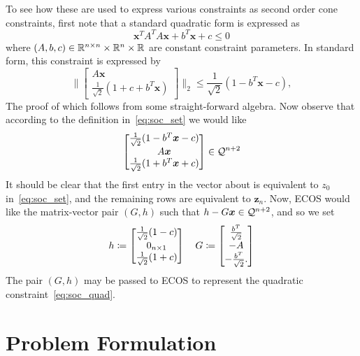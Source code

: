 \documentclass[12pt]{article}
\begin{document}
To see how these are used to express various constraints as second order cone constraints, first note that a standard quadratic form is expressed as
\begin{equation}
\bm{x}^T A ^T A \bm{x} + b^T \bm{x} + c \leq 0
\label{eq:soc_quad}
\end{equation}
where $(A,b,c) \in {\mathbb{R}}^{n\times n} \times {\mathbb{R}}^n \times {\mathbb{R}}$ are constant constraint parameters. In standard form, this constraint is expressed by
\begin{equation}
\biggr\| \begin{bmatrix}
A \bm{x} \\ \frac{1}{\sqrt{2}}( 1 + c + b^T \bm{x} )
\end{bmatrix} \biggr\|_2 \leq \frac{1}{\sqrt{2}} ( 1 - b^T \bm{x} - c),
\label{eq:soc_std}
\end{equation} 
The proof of which follows from some straight-forward algebra. Now observe that according to the definition in~\eqref{eq:soc_set} we would like
\begin{equation*}
\begin{bmatrix}
\frac{1}{\sqrt{2}} ( 1 - b^T \bm{x} - c) \\
A \bm{x} \\
\frac{1}{\sqrt{2}} ( 1 + b^T \bm{x} + c)
\end{bmatrix} \in \mathcal{Q}^{n+2}
\end{equation*}
It should be clear that the first entry in the vector about is equivalent to $z_0$ in~\eqref{eq:soc_set}, and the remaining rows are equivalent to $\bm{z}_n$. Now, ECOS would like the matrix-vector pair $(G,h)$ such that $h-G\bm{x}\in\mathcal{Q}^{n+2}$, and so we set
\begin{equation}
h \coloneqq \begin{bmatrix}
\frac{1}{\sqrt{2}}( 1 - c ) \\ 0_{n \times 1} \\ \frac{1}{\sqrt{2}}(1+c)
\end{bmatrix} \quad G \coloneqq \begin{bmatrix}
\frac{b^T}{\sqrt{2}} \\ -A \\ -\frac{b^T}{\sqrt{2}}.
\end{bmatrix}
\end{equation}
The pair $(G,h)$ may be passed to ECOS to represent the quadratic constraint~\eqref{eq:soc_quad}.

\section{Problem Formulation}
\end{document}
